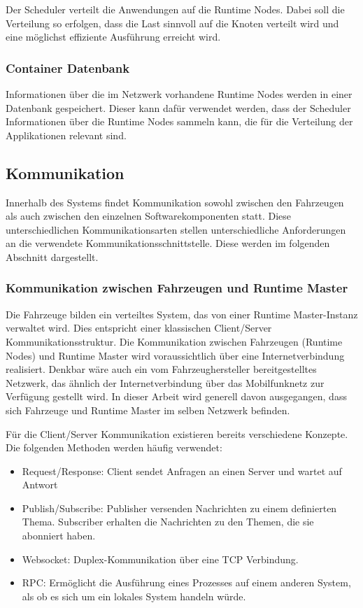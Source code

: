 Der Scheduler verteilt die Anwendungen auf die Runtime Nodes. Dabei soll die Verteilung so erfolgen, dass die Last sinnvoll auf die Knoten verteilt wird und eine möglichst effiziente Ausführung erreicht wird. 

\subsubsection{Container Datenbank}

 Informationen über die im Netzwerk vorhandene Runtime Nodes werden in einer Datenbank gespeichert. Dieser kann dafür verwendet werden, dass der Scheduler Informationen über die Runtime Nodes sammeln kann, die für die Verteilung der Applikationen relevant sind. 

\subsection{Kommunikation}
\label{Kommunikation}

Innerhalb des Systems findet Kommunikation sowohl zwischen den Fahrzeugen als auch zwischen den einzelnen Softwarekomponenten statt. Diese unterschiedlichen Kommunikationsarten stellen unterschiedliche Anforderungen an die verwendete Kommunikationsschnittstelle. Diese werden im folgenden Abschnitt dargestellt.

\subsubsection{Kommunikation zwischen Fahrzeugen und Runtime Master}
\label{Kommunikation zwischen Fahrzeugen und Runtime Master}

Die Fahrzeuge bilden ein verteiltes System, das von einer Runtime Master-Instanz verwaltet wird. Dies entspricht einer klassischen Client/Server Kommunikationsstruktur. Die Kommunikation zwischen Fahrzeugen (Runtime Nodes) und Runtime Master wird voraussichtlich über eine Internetverbindung realisiert. Denkbar wäre auch ein vom Fahrzeughersteller bereitgestelltes Netzwerk, das ähnlich der Internetverbindung über das Mobilfunknetz zur Verfügung gestellt wird. In dieser Arbeit wird generell davon ausgegangen, dass sich Fahrzeuge und Runtime Master im selben Netzwerk befinden. 

Für die Client/Server Kommunikation existieren bereits verschiedene Konzepte. Die folgenden Methoden werden häufig verwendet:

\begin{itemize}
    \item Request/Response: Client sendet Anfragen an einen Server und wartet auf Antwort
    \item Publish/Subscribe: Publisher versenden Nachrichten zu einem definierten Thema. Subscriber erhalten die Nachrichten zu den Themen, die sie abonniert haben.
    \item Websocket: Duplex-Kommunikation über eine \gls{TCP} Verbindung. 
    \item \gls{RPC}: Ermöglicht die Ausführung eines Prozesses auf einem anderen System, als ob es sich um ein lokales System handeln würde.
\end{itemize}


